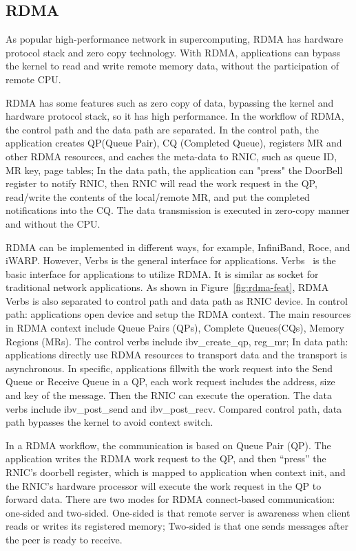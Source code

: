\subsection{RDMA}
As popular high-performance network in supercomputing, RDMA has hardware protocol stack and zero copy technology. With RDMA, applications can bypass the kernel to read and write remote memory data, without the participation of remote CPU. 

RDMA has some features such as zero copy of data, bypassing the kernel and hardware protocol stack, so it has high performance. In the workflow of RDMA, the control path and the data path are separated. In the control path, the application creates QP(Queue Pair), CQ (Completed Queue), registers MR and other RDMA resources, and caches the meta-data to RNIC, such as queue ID, MR key, page tables; In the data path, the application can "press"  the DoorBell register to notify RNIC, then RNIC will read the work request in the QP, read/write the contents of the local/remote MR, and put the completed notifications into the CQ. The data transmission is executed in zero-copy manner and without the CPU.

RDMA can be implemented in different ways, for example, InfiniBand, Roce, and iWARP. However, Verbs is the general interface for applications. Verbs~\cite{verbs} is the basic interface for applications to utilize RDMA. It is similar as socket for traditional network applications. As shown in Figure~\ref{fig:rdma-feat}, RDMA Verbs is also separated to control path and data path as RNIC device. In control path: applications open device and setup the RDMA context. The main resources in RDMA context include Queue Pairs (QPs), Complete Queues(CQs), Memory Regions (MRs). The control verbs include ibv\_create\_qp, reg\_mr;  In data path: applications directly use RDMA resources to transport data and the transport is asynchronous. In specific, applications fillwith the work request into the Send Queue or Receive Queue in a QP, each work request includes the address, size and key of the message. Then the RNIC can execute the operation. The data verbs include ibv\_post\_send and ibv\_post\_recv. Compared control path, data path bypasses the kernel to avoid context switch.

In a RDMA workflow, the communication is based on Queue Pair (QP). The application writes the RDMA work request to the QP, and then ``press''  the RNIC's doorbell register, which is mapped to application when context init, and the RNIC's hardware processor will execute the work request in the QP to forward data. There are two modes for RDMA connect-based communication: one-sided and two-sided. One-sided is that remote server is awareness when client reads or writes its registered memory; Two-sided is that one sends messages after the peer is ready to receive.